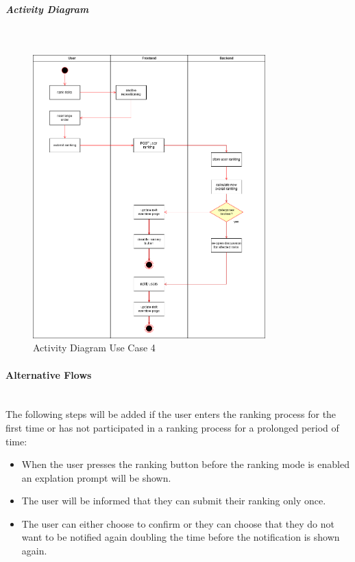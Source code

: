 \subparagraph{Activity Diagram}\mbox{}\\
\begin{figure}[h]
	\centering
	\includegraphics[width=0.8\textwidth]{Content/Domain/UC4RiskAdjustmentDiagram.png}
	\caption{Activity Diagram Use Case 4}
	\label{fig:label44}
\end{figure}

\paragraph*{Alternative Flows}\mbox{}\\

	The following steps will be added if the user enters the ranking process for the first time or has not participated in a ranking process for a prolonged period of time:
\begin{itemize}
	\vspace{-3mm}
	\setlength\itemsep{-1em}
	\item When the user presses the ranking button before the ranking mode is enabled an explation prompt will be shown.
	\item The user will be informed that they can submit their ranking only once.
	\item The user can either choose to confirm or they can choose that they do not want to be notified again doubling the time before the notification is shown again.
\end{itemize}
	
